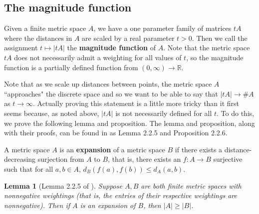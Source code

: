 \documentclass[11pt]{article}
\theoremstyle{mythm}
\newtheorem{lem}[defn]{Lemma}
\begin{document}
\subsection{The magnitude function}

Given a finite metric space $A$, we have a one parameter family of matrices $tA$ where the distances in $A$ are scaled by a real parameter $t > 0$. Then we call the assignment $t\mapsto\vert tA \vert$ the \textbf{magnitude function} of $A$. Note that the metric space $tA$ does not necessarily admit a weighting for all values of $t$, so the magnitude function is a partially defined function from $(0,\infty)\to\mathbb{R}$.

Note that as we scale up distances between points, the metric space $A$ ``approaches" the discrete space and so we want to be able to say that $\vert tA \vert \to \#A$ as $t \to \infty$. Actually proving this statement is a little more tricky than it first seems because, as noted above, $\vert tA \vert$ is not necessarily defined for all $t$. To do this, we prove the following lemma and proposition. The lemma and proposition, along with their proofs, can be found in \cite{leinster_magnitude_2011} as Lemma 2.2.5 and Proposition 2.2.6.

A metric space $A$ is an \textbf{expansion} of a metric space $B$ if there exists a distance-decreasing surjection from $A$ to $B$, that is, there exists an $f: A \to B$ surjective such that for all $a,b \in A$, $d_{B}(f(a),f(b)) \leq d_{A}(a,b)$.

\begin{lem}[Lemma 2.2.5 of \cite{leinster_magnitude_2011}]\label{lem:expansion}
Suppose $A,B$ are both finite metric spaces with nonnegative weightings (that is, the entries of their respective weightings are nonnegative). Then if $A$ is an expansion of $B$, then $\vert A \vert \geq \vert B \vert$.
\end{lem}
\end{document}
